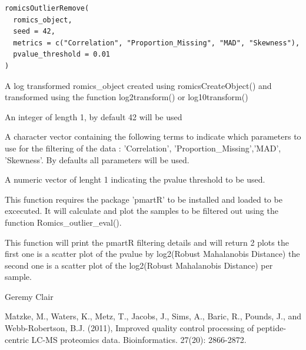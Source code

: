 \documentclass[a4paper]{book}
\begin{document}
%
\begin{Usage}
\begin{verbatim}
romicsOutlierRemove(
  romics_object,
  seed = 42,
  metrics = c("Correlation", "Proportion_Missing", "MAD", "Skewness"),
  pvalue_threshold = 0.01
)
\end{verbatim}
\end{Usage}
%
\begin{Arguments}
\begin{ldescription}
\item[\code{romics\_object}] A log transformed romics\_object created using romicsCreateObject() and transformed using the function log2transform() or log10transform()

\item[\code{seed}] An integer of length 1, by default 42 will be used

\item[\code{metrics}] A character vector containing the following terms to indicate which parameters to use for the filtering of the data : 'Correlation', 'Proportion\_Missing','MAD', 'Skewness'. By defaults all parameters will be used.

\item[\code{pvalue\_threshold}] A numeric vector of lenght 1 indicating the pvalue threshold to be used.
\end{ldescription}
\end{Arguments}
%
\begin{Details}
This function requires the package 'pmartR' to be installed and loaded to be excecuted. It will calculate and plot the samples to be filtered out using the function Romics\_outlier\_eval().
\end{Details}
%
\begin{Value}
This function will print the pmartR filtering details and will return 2 plots the first one is a scatter plot of the pvalue by log2(Robust Mahalanobis Distance) the second one is a scatter plot of the log2(Robust Mahalanobis Distance) per sample.
\end{Value}
%
\begin{Author}
Geremy Clair
\end{Author}
%
\begin{References}
Matzke, M., Waters, K., Metz, T., Jacobs, J., Sims, A., Baric, R., Pounds, J., and Webb-Robertson, B.J. (2011), Improved quality control processing of peptide-centric LC-MS proteomics data. Bioinformatics. 27(20): 2866-2872.
\end{References}
\end{document}
